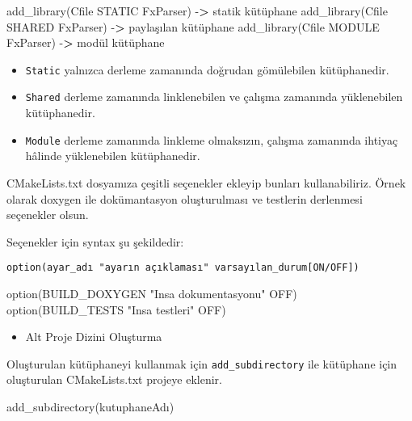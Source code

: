 \documentclass[
]{book}
\newenvironment{Shaded}{\begin{snugshade}}{\end{snugshade}}
\newcommand{\ExtensionTok}[1]{#1}
\newcommand{\NormalTok}[1]{#1}
\newcommand{\OperatorTok}[1]{\textcolor[rgb]{0.81,0.36,0.00}{\textbf{#1}}}
\newcommand{\StringTok}[1]{\textcolor[rgb]{0.31,0.60,0.02}{#1}}
\providecommand{\tightlist}{%
  \setlength{\itemsep}{0pt}\setlength{\parskip}{0pt}}
\begin{document}
\begin{Shaded}
\begin{Highlighting}[]
   \ExtensionTok{add\_library}\NormalTok{(Cfile STATIC FxParser) }\ExtensionTok{{-}}\OperatorTok{>}\NormalTok{ statik kütüphane}
   \ExtensionTok{add\_library}\NormalTok{(Cfile SHARED FxParser) }\ExtensionTok{{-}}\OperatorTok{>}\NormalTok{ paylaşılan kütüphane}
   \ExtensionTok{add\_library}\NormalTok{(Cfile MODULE FxParser) }\ExtensionTok{{-}}\OperatorTok{>}\NormalTok{ modül kütüphane }
\end{Highlighting}
\end{Shaded}

\begin{itemize}
\tightlist
\item
  \texttt{Static} yalnızca derleme zamanında doğrudan gömülebilen kütüphanedir.
\item
  \texttt{Shared} derleme zamanında linklenebilen ve çalışma zamanında yüklenebilen kütüphanedir.
\item
  \texttt{Module} derleme zamanında linkleme olmaksızın, çalışma zamanında ihtiyaç hâlinde yüklenebilen kütüphanedir.
\end{itemize}

CMakeLists.txt dosyamıza çeşitli seçenekler ekleyip bunları kullanabiliriz. Örnek olarak doxygen ile dokümantasyon oluşturulması ve testlerin derlenmesi seçenekler olsun.

Seçenekler için syntax şu şekildedir:

\texttt{option(ayar\_adı\ "ayarın\ açıklaması"\ varsayılan\_durum{[}ON/OFF{]})}

\begin{Shaded}
\begin{Highlighting}[]
   \ExtensionTok{option}\NormalTok{(BUILD\_DOXYGEN }\StringTok{"Insa dokumentasyonu"}\NormalTok{ OFF)}
   \ExtensionTok{option}\NormalTok{(BUILD\_TESTS }\StringTok{"Insa testleri"}\NormalTok{ OFF)}
\end{Highlighting}
\end{Shaded}

\begin{itemize}
\tightlist
\item
  Alt Proje Dizini Oluşturma
\end{itemize}

Oluşturulan kütüphaneyi kullanmak için \texttt{add\_subdirectory} ile kütüphane için oluşturulan CMakeLists.txt projeye eklenir.

\begin{Shaded}
\begin{Highlighting}[]
   \ExtensionTok{add\_subdirectory}\NormalTok{(kutuphaneAdı)}
\end{Highlighting}
\end{Shaded}
\end{document}
